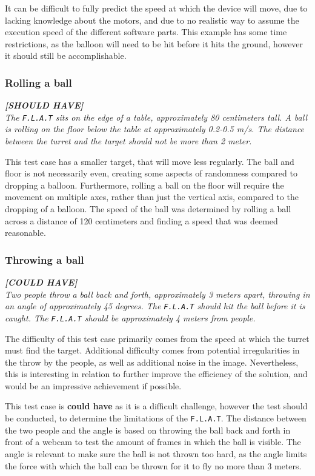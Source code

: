 It can be difficult to fully predict the speed at which the device will move, due to lacking knowledge about the motors, and due to no realistic way to assume the execution speed of the different software parts.
This example has some time restrictions, as the balloon will need to be hit before it hits the ground, however it should still be accomplishable.

\subsubsection{Rolling a ball}
\textit{\textbf{[SHOULD HAVE]}}\\
\textit{The \texttt{F.L.A.T} sits on the edge of a table, approximately 80 centimeters tall.
A ball is rolling on the floor below the table at approximately 0.2-0.5 m/s.
The distance between the turret and the target should not be more than 2 meter.}

This test case has a smaller target, that will move less regularly.
The ball and floor is not necessarily even, creating some aspects of randomness compared to dropping a balloon.
Furthermore, rolling a ball on the floor will require the movement on multiple axes, rather than just the vertical axis, compared to the dropping of a balloon.
The speed of the ball was determined by rolling a ball across a distance of 120 centimeters and finding a speed that was deemed reasonable.

\subsubsection{Throwing a ball}
\textit{\textbf{[COULD HAVE]}}\\
\textit{Two people throw a ball back and forth, approximately 3 meters apart, throwing in an angle of approximately 45 degrees.
The \texttt{F.L.A.T} should hit the ball before it is caught.
The \texttt{F.L.A.T} should be approximately 4 meters from people.}

The difficulty of this test case primarily comes from the speed at which the turret must find the target.
Additional difficulty comes from potential irregularities in the throw by the people, as well as additional noise in the image.
Nevertheless, this is interesting in relation to further improve the efficiency of the solution, and would be an impressive achievement if possible.

This test case is \textbf{could have} as it is a difficult challenge, however the test should be conducted, to determine the limitations of the \texttt{F.L.A.T}.
The distance between the two people and the angle is based on throwing the ball back and forth in front of a webcam to test the amount of frames in which the ball is visible.
The angle is relevant to make sure the ball is not thrown too hard, as the angle limits the force with which the ball can be thrown for it to fly no more than 3 meters.

